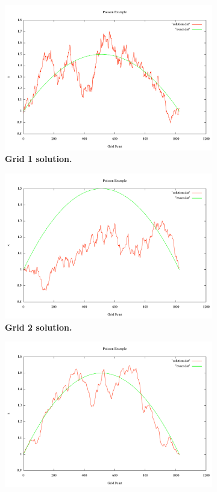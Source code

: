 \documentclass[note]{TechNote}
\begin{document}
\begin{figure}[h!]
  \centering
  \begin{subfigure}[b]{0.32\textwidth}
    \includegraphics[width=\textwidth]{7_sec_1_level.pdf}
    \caption{\textbf{Grid 1 solution.}}
  \end{subfigure}
  \begin{subfigure}[b]{0.32\textwidth}
    \includegraphics[width=\textwidth]{cg_2_level.pdf}
    \caption{\textbf{Grid 2 solution.}}
  \end{subfigure}
  \begin{subfigure}[b]{0.32\textwidth}
    \includegraphics[width=\textwidth]{cg_3_level.pdf}

\end{subfigure}
\end{figure}
\end{document}
